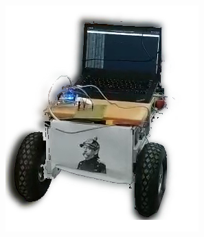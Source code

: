 \documentclass{beamer}
\begin{document}
\begin{tframe}
\begin{columns}
        \begin{column}{0.45\textwidth}
            \begin{center}
                \begin{figure}
                    \centering
                    \includegraphics[scale=0.5]{img/ottofinal.png}
                \end{figure}
            \end{center}
        \end{column}
    \end{columns}
\end{tframe}
\end{document}

